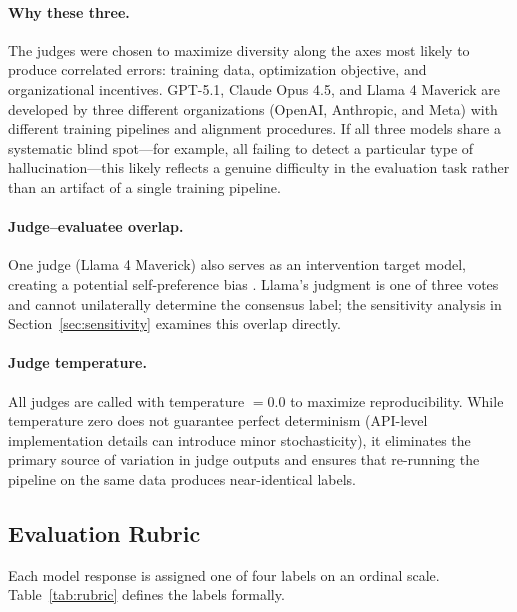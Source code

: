 \paragraph{Why these three.} The judges were chosen to maximize diversity along the axes most likely to produce correlated errors: training data, optimization objective, and organizational incentives. GPT-5.1, Claude Opus 4.5, and Llama 4 Maverick are developed by three different organizations (OpenAI, Anthropic, and Meta) with different training pipelines and alignment procedures. If all three models share a systematic blind spot---for example, all failing to detect a particular type of hallucination---this likely reflects a genuine difficulty in the evaluation task rather than an artifact of a single training pipeline.

\paragraph{Judge--evaluatee overlap.} One judge (Llama 4 Maverick) also serves as an intervention target model, creating a potential self-preference bias \citep{wataoka2024selfpreference}. Llama's judgment is one of three votes and cannot unilaterally determine the consensus label; the sensitivity analysis in Section~\ref{sec:sensitivity} examines this overlap directly.

\paragraph{Judge temperature.} All judges are called with temperature $= 0.0$ to maximize reproducibility. While temperature zero does not guarantee perfect determinism (API-level implementation details can introduce minor stochasticity), it eliminates the primary source of variation in judge outputs and ensures that re-running the pipeline on the same data produces near-identical labels.

\subsection{Evaluation Rubric}
\label{sec:rubric}

Each model response is assigned one of four labels on an ordinal scale. Table~\ref{tab:rubric} defines the labels formally.

